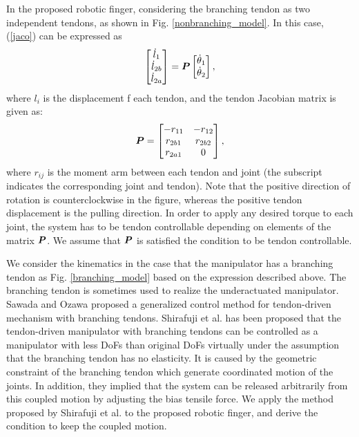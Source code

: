 \documentclass{llncs}
\def\vect#1{\mbox{\boldmath$#1$}}
\begin{document}
In the proposed robotic finger, considering the branching tendon as two independent tendons, as shown in Fig. \ref{nonbranching_model}.
In this case, (\ref{jaco}) can be expressed as
\begin{align}
	\begin{bmatrix}
		\dot{l}_{1}\\
		\dot{l}_{2b}\\
		\dot{l}_{2a}
	\end{bmatrix}
					=\vect{P}
					\begin{bmatrix}
					\dot{\theta}_{1}\\
					\dot{\theta}_{2}
					\end{bmatrix},
\label{jaco_relation}
\end{align}
where $l_{i}$ is
the displacement f each tendon,
and the tendon Jacobian matrix is given as:
\begin{align}
	\vect{P}=
			\begin{bmatrix}
				-r_{11}&-r_{12}\\
				r_{2b1}&r_{2b2}\\
				r_{2a1}&0
			\end{bmatrix},
\label{jacobian_value}
\end{align}
where $r_{ij}$ is the moment arm between each tendon and joint (the subscript indicates the corresponding joint and tendon).
Note that the positive direction of rotation is counterclockwise in the figure,
whereas the positive tendon displacement is the pulling direction.
In order to apply any desired torque to each joint, the system has to be tendon controllable depending on elements of the matrix $\vect{P}$\cite{kobayashi1998}.
We assume that $\vect{P}$ is satisfied the condition to be tendon controllable.

We consider the kinematics in the case that the manipulator has a branching tendon as Fig. \ref{branching_model} based on the expression described above.
The branching tendon is sometimes used to realize the underactuated manipulator\cite{Birglen2008}.
Sawada and Ozawa\cite{sawada2012} proposed a generalized control method for tendon-driven mechanism with branching tendons.
Shirafuji et al.\cite{Shirafuji2014b} has been proposed that the tendon-driven manipulator with branching tendons can be controlled as a manipulator with less DoFs than original DoFs virtually under the assumption that the branching tendon has no elasticity.
It is caused by the geometric constraint of the branching tendon which generate coordinated motion of the joints. 
In addition, they implied that the system can be released arbitrarily from this coupled motion by adjusting the bias tensile force.
We apply the method proposed by Shirafuji et al.\cite{Shirafuji2014b} to the proposed robotic finger, and derive the condition to keep the coupled motion.
\end{document}
